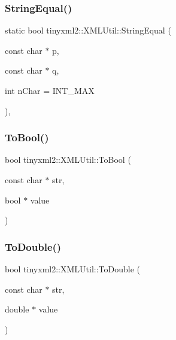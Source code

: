 \subsubsection{\texorpdfstring{String\+Equal()}{StringEqual()}}
{\footnotesize\ttfamily static bool tinyxml2\+::\+X\+M\+L\+Util\+::\+String\+Equal (\begin{DoxyParamCaption}\item[{const char $\ast$}]{p,  }\item[{const char $\ast$}]{q,  }\item[{int}]{n\+Char = {\ttfamily INT\+\_\+MAX} }\end{DoxyParamCaption})\hspace{0.3cm}{\ttfamily [inline]}, {\ttfamily [static]}}

\mbox{\label{classtinyxml2_1_1_x_m_l_util_ae5b03e0a1ca5d42052a7ac540f7aa12a}} 
\subsubsection{\texorpdfstring{To\+Bool()}{ToBool()}}
{\footnotesize\ttfamily bool tinyxml2\+::\+X\+M\+L\+Util\+::\+To\+Bool (\begin{DoxyParamCaption}\item[{const char $\ast$}]{str,  }\item[{bool $\ast$}]{value }\end{DoxyParamCaption})\hspace{0.3cm}{\ttfamily [static]}}

\mbox{\label{classtinyxml2_1_1_x_m_l_util_ad8f75ac140fb19c1c6e164a957c4cd53}} 
\subsubsection{\texorpdfstring{To\+Double()}{ToDouble()}}
{\footnotesize\ttfamily bool tinyxml2\+::\+X\+M\+L\+Util\+::\+To\+Double (\begin{DoxyParamCaption}\item[{const char $\ast$}]{str,  }\item[{double $\ast$}]{value }\end{DoxyParamCaption})\hspace{0.3cm}{\ttfamily [static]}}

